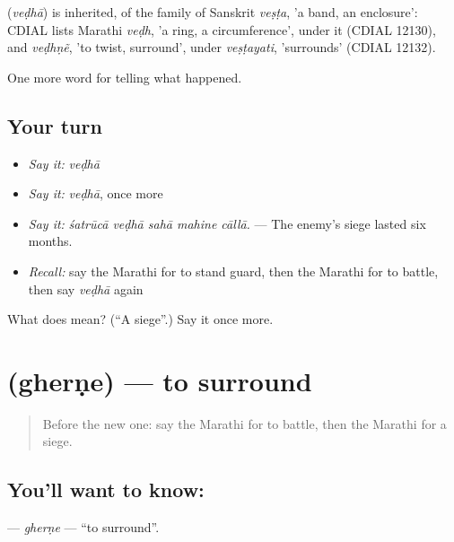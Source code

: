 \begin{cousinweb}
\textbf{} (\emph{veḍhā}) is inherited, of the family of Sanskrit \emph{veṣṭa}, 'a band, an enclosure': CDIAL lists Marathi \emph{veḍh}, 'a ring, a circumference', under it (CDIAL 12130), and \emph{veḍhṇẽ}, 'to twist, surround', under \emph{veṣṭayati}, 'surrounds' (CDIAL 12132).
\end{cousinweb}

\begin{grammarlens}[title={What you've built}]
One more word for telling what happened.
\end{grammarlens}

\subsection*{Your turn}
\begin{itemize}
\raggedright
  \item \emph{Say it:} \emph{veḍhā}
  \item \emph{Say it:} \emph{veḍhā}, once more
  \item \emph{Say it:} \emph{śatrūcā veḍhā sahā mahine cāllā.} — The enemy's siege lasted six months.
  \item \emph{Recall:} say the Marathi for to stand guard, then the Marathi for to battle, then say \emph{veḍhā} again
\end{itemize}

\begin{tcolorbox}[breakable,colback=teal!4,colframe=teal!35!black,title={Before you move on}]
What does  mean? (\textquotedblleft{}A siege\textquotedblright{}.) Say it once more.
\end{tcolorbox}
\section[\texorpdfstring{\mr{घेरणे} (gherṇe)}{घेरणे (gherṇe)}]{ (gherṇe) — to surround}

\label{lesson:MR-C331-gherne}



\begin{quote}
Before the new one: say the Marathi for to battle, then the Marathi for a siege.
\end{quote}

\subsection*{You'll want to know: }
\textbf{} — \emph{gherṇe} — \textquotedblleft{}to surround\textquotedblright{}.

